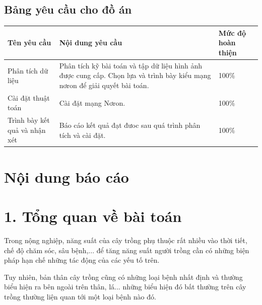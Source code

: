 \documentclass{article}
\newcommand\T{\rule{0pt}{2.6ex}}       %
\newcommand\B{\rule[-1.2ex]{0pt}{0pt}} %
\begin{document}
	\subsection{Bảng yêu cầu cho đồ án}
	\begin{table}[H]
		\begin{tabular}{ | p{5cm} | p{6.5cm} | p{3cm} |}\hline	
			Tên yêu cầu & Nội dung yêu cầu & Mức độ hoàn thiện  \T\B\\\hline
			Phân tích dữ liệu & Phân tích kỹ bài toán và tập dữ liệu hình ảnh được cung cấp. Chọn lựa và
			trình bày kiểu mạng nơron để giải quyết bài toán. & 100\%  \T\B\\\hline
			Cài đặt thuật toán & Cài đặt mạng Nơron. & 100\%  \T\B\\\hline
			Trình bày kết quả và nhận xét & Báo cáo kết quả đạt đưoc sau quá trình phân tích và cài đặt. & 100\%  \T\B\\\hline
		\end{tabular}
	\end{table}	
	\section{Nội dung báo cáo}
	\section{1. Tổng quan về bài toán}
	\qquad Trong nộng nghiệp, năng suất của cây trồng phụ thuộc rất nhiều vào thời
	tiết, chế độ chăm sóc, sâu bệnh,... để tăng năng suất người trồng cần có những
	biện pháp hạn chế những tác động của các yếu tố trên.
	
	Tuy nhiên, bản thân cây trồng cũng có những loại bệnh nhất định và thường
	biểu hiện ra bên ngoài trên thân, lá... những biểu hiện đó bất thường trên cây
	trồng thường liện quan tới một loại bệnh nào đó.
	
\end{document}
